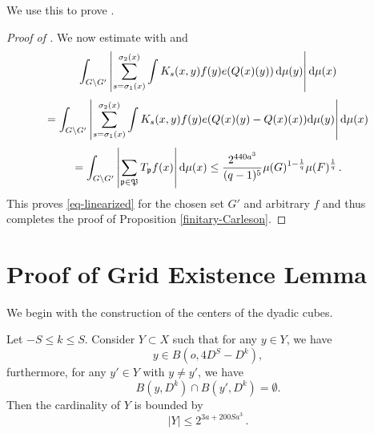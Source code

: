 We use this to prove .
\begin{proof}[Proof of ]
\leanok
We now estimate with  and 
\begin{equation}
 \int_{G \setminus G'} \left|\sum_{s={\sigma_1}(x)}^{{\sigma_2}(x)} \int K_s(x,y) f(y) e({Q}(x)(y)) \, \mathrm{d}\mu(y)\right| \mathrm{d}\mu(x)
\end{equation}
\begin{equation}
 =\int_{G \setminus G'} \left|\sum_{s={\sigma_1}(x)}^{{\sigma_2}(x)} \int K_s(x,y) f(y) e({Q}(x)(y) - {Q}(x)(x))\mathrm{d}\mu(y)\right| \mathrm{d}\mu(x)
\end{equation}
\begin{equation}
 =\int_{G \setminus G'} \left|\sum_{{\mathfrak p}\in {\mathfrak P}}T_{{\mathfrak p}} f(x)\right| \mathrm{d}\mu(x)
 \le \frac{2^{440a^3}}{(q-1)^5} \mu(G)^{1 - \frac{1}{q}} \mu(F)^{\frac{1}{q}} \,.
\end{equation}
This proves \eqref{eq-linearized} for the chosen set $G'$ and arbitrary $f$ and thus completes the proof of Proposition
\ref{finitary-Carleson}.
\end{proof}


\section{Proof of Grid Existence Lemma}
\label{subsecdyadic}

We begin with the construction of the centers of the dyadic cubes.
\begin{lemma}
    \label{counting-balls}
    \leanok
    Let $-S\le k\le S$. Consider $Y\subset X$ such that for any $y\in Y$, we have
    \begin{equation}\label{ybinb}
    y\in B(o,4D^S-D^k),
    \end{equation}
    furthermore, for any $y'\in Y$ with $y\neq y'$, we have
    \begin{equation} \label{eq-disj-yballs}
        B(y,D^k)\cap B(y',D^k)=\emptyset.
    \end{equation}
    Then the cardinality of $Y$ is bounded by
    \begin{equation}\label{boundY}
        |Y|\le 2^{3a + 200Sa^3}\, .
    \end{equation}
\end{lemma}


